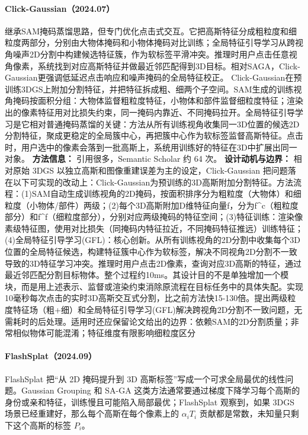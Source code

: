 \paragraph{Click-Gaussian（2024.07）\cite{2407_11793}}
继承SAM掩码蒸馏思路，但专门优化点击式交互。它把高斯特征分成粗粒度和细粒度两部分，分别由大物体掩码和小物体掩码对比训练；全局特征引导学习从跨视角噪声2D分割中构建候选特征簇，作为软标签平滑冲突。推理时用户点击任意视角像素，系统找到对应高斯特征并做最近邻匹配得到3D目标。相对SAGA，Click-Gaussian更强调低延迟点击响应和噪声掩码的全局特征校正。
Click-Gaussian在预训练3DGS上附加分割特征，并把特征拆成粗、细两个子空间。SAM生成的训练视角掩码按面积分组：大物体监督粗粒度特征，小物体和部件监督细粒度特征；渲染出的像素特征用对比损失约束，同一掩码内靠近、不同掩码拉开。全局特征引导学习是它相对普通掩码蒸馏的关键：方法从所有训练视角收集同一3D位置的候选2D分割特征，聚成更稳定的全局簇中心，再把簇中心作为软标签监督高斯特征。点击时，用户选中的像素会落到一批高斯上，系统用训练好的特征在3D中扩展出同一对象。
\textbf{方法信息：} 引用很多，Semantic Scholar 约 64 次。
\textbf{设计动机与边界：} 相对原始 3DGS 以独立高斯和图像重建误差为主的设定，Click-Gaussian 把问题落在以下可实现的改动上：Click-Gaussian为预训练的3D高斯附加分割特征。方法流程：(1)SAM自动生成训练视角的2D掩码，按面积排序分为粗粒度（大物体）和细粒度（小物体/部件）两级；(2)每个3D高斯附加D维特征向量f，分为f\^{}c（粗粒度部分）和f\^{}f（细粒度部分），分别对应两级掩码的特征空间；(3)特征训练：渲染像素级特征图，使用对比损失（同掩码内特征拉近，不同掩码特征推远）训练特征；(4)全局特征引导学习(GFL)：核心创新。从所有训练视角的2D分割中收集每个3D位置的全局特征候选，构建特征簇中心作为软标签，解决不同视角2D分割不一致导致的3D特征学习冲突。推理时用户点击2D像素，查询对应3D高斯的特征，通过最近邻匹配分割目标物体。整个过程约10ms。其设计目的不是单独增加一个模块，而是用上述表示、监督或渲染约束消除原流程在目标任务中的具体失配。实现10毫秒每次点击的实时3D高斯交互式分割，比之前方法快15-130倍。提出两级粒度特征场（粗+细）和全局特征引导学习(GFL)解决跨视角2D分割不一致问题，无需耗时的后处理。适用时还应保留论文给出的边界：依赖SAM的2D分割质量；非常相似物体可能混淆；特征维度有限影响细粒度区分
\paragraph{FlashSplat（2024.09）\cite{2409_08270}}
FlashSplat 把“从 2D 掩码提升到 3D 高斯标签”写成一个可求全局最优的线性问题。Gaussian Grouping 和 SA-GA 这类方法通常要通过梯度下降学习每个高斯的身份或亲和特征，训练慢且可能陷入局部最优；FlashSplat 观察到，如果 3DGS 场景已经重建好，那么每个高斯在每个像素上的 $\alpha_i T_i$ 贡献都是常数，未知量只剩下这个高斯的标签 $P_i$。

